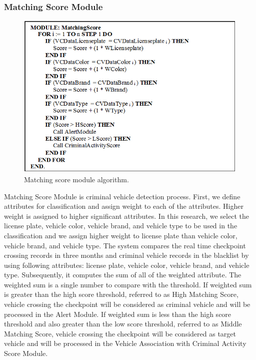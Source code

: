 \documentclass{llncs}
\begin{document}
\subsubsection{Matching Score Module}
%
\begin{figure}
\vspace{1.8mm}
\centering
\includegraphics[width=1\textwidth]{images/MatchingAlgorithm.jpg}
\caption{Matching score module algorithm.}
\label{fig:matchingAlgo}
\end{figure}
%
Matching Score Module is criminal vehicle detection process. 
First, we define attributes for classification and assign weight to each of the attributes. 
Higher weight is assigned to higher significant attributes.
In this research, we select the license plate, vehicle color, vehicle brand, and vehicle type to be used in the classification and we assign higher weight to license plate than vehicle color, vehicle brand, and vehicle type. 
The system compares the real time checkpoint crossing records in three months and criminal vehicle records in the blacklist by using following attributes: license plate, vehicle color, vehicle brand, and vehicle type. 
Subsequently, it computes the sum of all of the weighted attribute. 
The weighted sum is a single number to compare with the threshold.  
If weighted sum is greater than the high score threshold, referred to as High Matching Score, vehicle crossing the checkpoint will be considered as criminal vehicle and will be processed in the Alert Module. 
If weighted sum is less than the high score threshold and also greater than the low score threshold, referred to as Middle Matching Score, vehicle crossing the checkpoint will be considered as target vehicle and will be processed in the Vehicle Association with Criminal Activity Score Module. 
\end{document}
